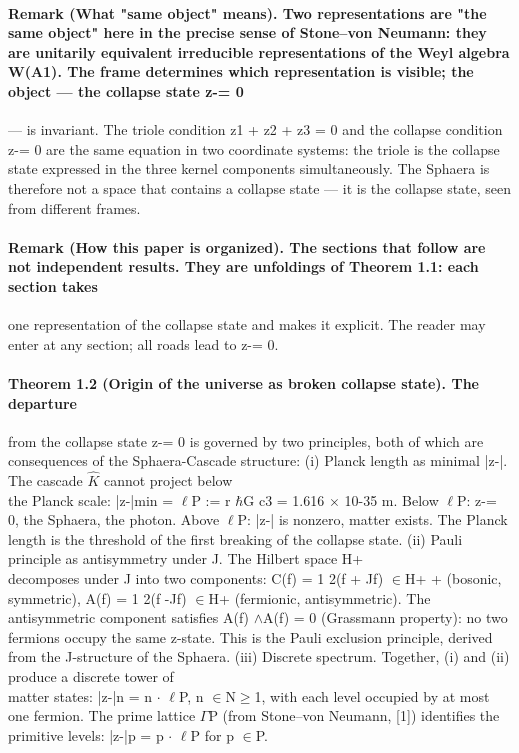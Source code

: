 \paragraph*{Remark (What "same object" means). Two representations are "the same object" here in the precise sense of Stone--von Neumann: they are unitarily equivalent irreducible representations of the Weyl algebra W(A1). The frame determines which representation is visible; the object --- the collapse state z-= 0}
--- is invariant. The triole condition z1 + z2 + z3 = 0 and the collapse condition z-= 0 are the same equation in two coordinate systems: the triole is the collapse state expressed in the three kernel components simultaneously. The Sphaera is therefore not a space that contains a collapse state --- it is the collapse state, seen from different frames.
\paragraph*{Remark (How this paper is organized). The sections that follow are not independent results. They are unfoldings of Theorem 1.1: each section takes}
one representation of the collapse state and makes it explicit. The reader may enter at any section; all roads lead to z-= 0.
\paragraph*{Theorem 1.2 (Origin of the universe as broken collapse state). The departure}
from the collapse state z-= 0 is governed by two principles, both of which are consequences of the Sphaera-Cascade structure:
(i) Planck length as minimal |z-|. The cascade $\hat K$ cannot project below\\
the Planck scale: |z-|min = $\ell$P := r $\hbar$G c3 = 1.616 $\times$ 10-35 m. Below $\ell$P: z-= 0, the Sphaera, the photon. Above $\ell$P: |z-| is nonzero, matter exists. The Planck length is the threshold of the first breaking of the collapse state.
(ii) Pauli principle as antisymmetry under J. The Hilbert space H+\\
decomposes under J into two components: C(f) = 1 2(f + Jf) $\in$H+ + (bosonic, symmetric), A(f) = 1 2(f -Jf) $\in$H+ (fermionic, antisymmetric). The antisymmetric component satisfies A(f) $\wedge$A(f) = 0 (Grassmann property): no two fermions occupy the same z-state. This is the Pauli exclusion principle, derived from the J-structure of the Sphaera.
(iii) Discrete spectrum. Together, (i) and (ii) produce a discrete tower of\\
matter states: |z-|n = n $\cdot$ $\ell$P, n $\in$N$\geq$1, with each level occupied by at most one fermion. The prime lattice $\Gamma$P (from Stone--von Neumann, [1]) identifies the primitive levels: |z-|p = p $\cdot$ $\ell$P for p $\in$P.
